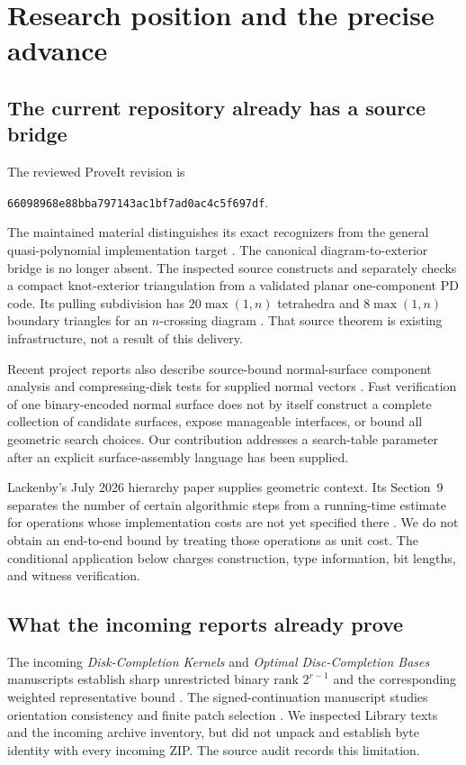 \documentclass[11pt,a4paper]{article}
\theoremstyle{definition}
\theoremstyle{remark}
\newcommand{\snapshot}{66098968e88bba797143ac1bf7ad0ac4c5f697df}
\begin{document}
\section{Research position and the precise advance}\label{sec:position}
\subsection{The current repository already has a source bridge}
The reviewed ProveIt revision is
\begin{center}\small\texttt{\snapshot}.\end{center}
The maintained  material distinguishes its exact
recognizers from the general quasi-polynomial implementation target \cite{repo}.
The canonical diagram-to-exterior bridge is no longer absent. The inspected source
 constructs and separately checks a compact
knot-exterior triangulation from a validated planar one-component PD code. Its pulling
subdivision has $20\max(1,n)$ tetrahedra and $8\max(1,n)$ boundary triangles for an
$n$-crossing diagram \cite{exterior}. That source theorem is existing infrastructure,
not a result of this delivery.

Recent project reports also describe source-bound normal-surface component analysis and
compressing-disk tests for supplied normal vectors \cite{kernels,signed}. Fast verification
of one binary-encoded normal surface does not by itself construct a complete collection
of candidate surfaces, expose manageable interfaces, or bound all geometric search
choices. Our contribution addresses a search-table parameter after an explicit
surface-assembly language has been supplied.

Lackenby's July 2026 hierarchy paper supplies geometric context. Its Section~9 separates
the number of certain algorithmic steps from a running-time estimate for operations whose
implementation costs are not yet specified there \cite{lackenby}. We do not obtain an
end-to-end bound by treating those operations as unit cost. The conditional application
below charges construction, type information, bit lengths, and witness verification.

\subsection{What the incoming reports already prove}
The incoming \emph{Disk-Completion Kernels} and \emph{Optimal Disc-Completion Bases}
manuscripts establish sharp unrestricted binary rank $2^{r-1}$ and the corresponding
weighted representative bound \cite{kernels,bases}. The signed-continuation manuscript
studies orientation consistency and finite patch selection \cite{signed}. We inspected
Library texts and the incoming archive inventory, but did not unpack and establish byte
identity with every incoming ZIP. The source audit records this limitation.
\end{document}
